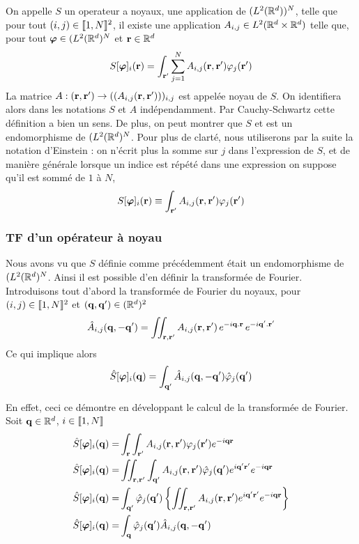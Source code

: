 \documentclass[10.5pt]{article}
\begin{document}
\begin{multicols}{2}
On appelle $S$ un operateur a noyaux, une application de $(L^2(\mathbb{R}^d))^N$, telle que pour tout $(i,j) \in  \llbracket 1,N \rrbracket ^2$, il existe une application $A_{i,j} \in L^2(\mathbb{R}^d\times\mathbb{R}^d)$ telle que,  pour tout $\boldsymbol{ \varphi} \in (L^2(\mathbb{R}^d)^N$ et ${\bf r} \in \mathbb{R}^d$
 \begin{equation}
  S[\boldsymbol{ \varphi}]_i({\bf r}) = \int_{{\bf r}'} \sum_{j=1}^{N} A_{i,j}({\bf r},{\bf r}')\varphi_j({\bf r}')
 \end{equation}
 La matrice $A : ({\bf r},{\bf r}') \rightarrow ((A_{i,j}({\bf r},{\bf r}')))_{i,j}$ est appelée noyau de $S$.  On identifiera alors dans les notations $S$ et $A$ indépendamment. Par Cauchy-Schwartz cette définition a bien  un sens. De plus, on peut montrer que $S$ et est un endomorphisme de $(L^2(\mathbb{R}^d)^N$. Pour plus de clarté, nous utiliserons par la suite la notation d'Einstein : on n'écrit plus la somme sur $j$ dans l'expression de $S$, et de manière générale lorsque un indice est répété dans une expression on suppose qu'il est sommé de $1$ à $N$, 
  \begin{equation}
  S[\boldsymbol{ \varphi}]_i({\bf r}) \equiv \int_{{\bf r}'} A_{i,j}({\bf r},{\bf r}')\varphi_j({\bf r}')
 \end{equation}
 



\vspace*{11pt}

\subsubsection{TF d'un opérateur à noyau}

Nous avons vu que $S$ définie comme précédemment était un endomorphisme de $(L^2(\mathbb{R}^d)^N$. Ainsi il est possible d'en définir la transformée de Fourier. Introduisons tout d'abord la transformée de Fourier du noyaux, pour $(i,j) \in  \llbracket 1,N \rrbracket ^2$ et $({\bf q}, {\bf q}') \in (\mathbb{R}^d)^2 $
\begin{equation}
	 \hat{A}_{i,j}({\bf q}, -{\bf q}') = \iint_{{\bf r},{\bf r}'} A_{i,j}({\bf r},{\bf r}')\,e^{-i{\bf q}.{\bf r}} \, e^{-i {\bf q}'.{\bf r}'} 
\end{equation}
Ce qui implique alors 
\begin{equation}
	 \hat{S}[\boldsymbol{ \varphi}]_i({\bf q}) = \int_{{\bf q}'} \hat{A}_{i,j}({\bf q}, -{\bf q}') \hat{\varphi}_j({\bf q}')
\end{equation}



{\footnotesize
\noindent
En effet, ceci ce démontre en développant le calcul de la transformée de Fourier. Soit ${\bf q} \in \mathbb{R}^d$, $i \in  \llbracket 1,N \rrbracket $
\begin{align}
 \hat{S}[\boldsymbol{ \varphi}]_i({\bf q})  = & \int_{{\bf r}} \int_{{\bf r}'} A_{i,j}({\bf r},{\bf r}')\varphi_j({\bf r}') e^{-i{\bf q}{\bf r}}  \\
\hat{S}[\boldsymbol{ \varphi}]_i({\bf q})  = & \iint_{{\bf r}, {\bf r}'} \int_{{\bf q}'} A_{i,j}({\bf r},{\bf r}') \hat{\varphi}_j({\bf q}') e^{i{\bf q}'{\bf r}'} e^{- i{\bf q}{\bf r}} \\
 \hat{S}[\boldsymbol{ \varphi}]_i({\bf q})  = &   \int_{{\bf q}'} \hat{\varphi}_j({\bf q}') \left\{ \iint_{{\bf r}, {\bf r}'} A_{i,j}({\bf r},{\bf r}')  e^{i{\bf q}'{\bf r}'} e^{- i{\bf q}{\bf r}}  \right\}  \\
\hat{S}[\boldsymbol{ \varphi}]_i({\bf q}) = & \int_{{\bf q}}  \hat{\varphi}_j({\bf q}') \hat{A}_{i,j}({\bf q}, -{\bf q}')
\end{align}
}


\end{multicols}
\end{document}
